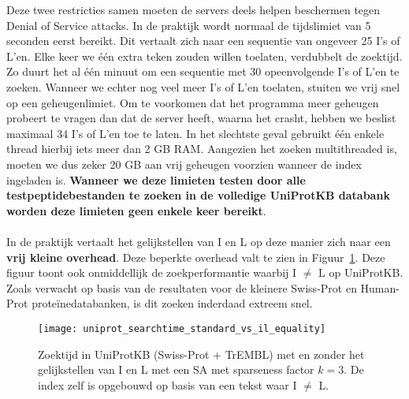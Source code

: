 Deze twee restricties samen moeten de servers deels helpen beschermen tegen Denial of Service attacks.
In de praktijk wordt normaal de tijdslimiet van 5 seconden eerst bereikt.
Dit vertaalt zich naar een sequentie van ongeveer 25 I's of L'en.
Elke keer we één extra teken zouden willen toelaten, verdubbelt de zoektijd.
Zo duurt het al één minuut om een sequentie met 30 opeenvolgende I's of L'en te zoeken.
Wanneer we echter nog veel meer I's of L'en toelaten, stuiten we vrij snel op een geheugenlimiet.
Om te voorkomen dat het programma meer geheugen probeert te vragen dan dat de server heeft, waarna het crasht, hebben we beslist maximaal 34 I's of L'en toe te laten.
In het slechtste geval gebruikt één enkele thread hierbij iets meer dan 2 GB RAM\@.
Aangezien het zoeken multithreaded is, moeten we dus zeker 20 GB aan vrij geheugen voorzien wanneer de index ingeladen is.
\textbf{Wanneer we deze limieten testen door alle testpeptidebestanden te zoeken in de volledige UniProtKB databank worden deze limieten geen enkele keer bereikt}.
\\ \\
In de praktijk vertaalt het gelijkstellen van I en L op deze manier zich naar een \textbf{vrij kleine overhead}.
Deze beperkte overhead valt te zien in Figuur~\ref{fig:uniprot_search}.
Deze figuur toont ook onmiddellijk de zoekperformantie waarbij I $\neq$ L op UniProtKB\@.
Zoals verwacht op basis van de resultaten voor de kleinere Swiss-Prot en Human-Prot proteïnedatabanken, is dit zoeken inderdaad extreem snel.

\begin{figure}[ht]
    \centering
    \texttt{[image: uniprot\_searchtime\_standard\_vs\_il\_equality]}
    \caption{Zoektijd in UniProtKB (Swiss-Prot + TrEMBL) met en zonder het gelijkstellen van I en L met een SA met sparseness factor $k = 3$. De index zelf is opgebouwd op basis van een tekst waar I $\neq$ L.}
    \label{fig:uniprot_search}
\end{figure}

